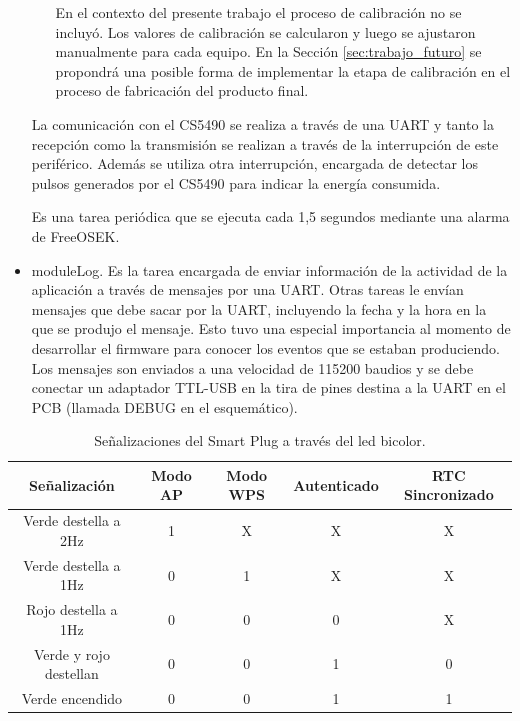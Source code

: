 \begin{itemize}
\begin{itemize}
En el contexto del presente trabajo el proceso de calibración no se incluyó. Los valores de calibración se calcularon y luego se ajustaron manualmente para cada equipo. En la Sección \ref{sec:trabajo_futuro} se propondrá una posible forma de implementar la etapa de calibración en el proceso de fabricación del producto final.
\end{itemize}

La comunicación con el CS5490 se realiza a través de una UART y tanto la recepción como la transmisión se realizan a través de la interrupción de este periférico. Además se utiliza otra interrupción, encargada de detectar los pulsos generados por el CS5490 para indicar la energía consumida.

Es una tarea periódica que se ejecuta cada 1,5 segundos mediante una alarma de FreeOSEK.

\item moduleLog. Es la tarea encargada de enviar información de la actividad de la aplicación a través de mensajes por una UART. Otras tareas le envían mensajes que debe sacar por la UART, incluyendo la fecha y la hora en la que se produjo el mensaje. Esto tuvo una especial importancia al momento de desarrollar el firmware para conocer los eventos que se estaban produciendo. Los mensajes son enviados a una velocidad de 115200 baudios y se debe conectar un adaptador TTL-USB en la tira de pines destina a la UART en el PCB (llamada DEBUG en el esquemático).

\end{itemize}


\begin{table}[h]
	\centering
	\caption[Señalizaciones del Smart Plug]{Señalizaciones del Smart Plug a través del led bicolor.}
	\begin{tabular}{c c c c c}    
		\toprule
		\textbf{Señalización} 	 & \textbf{Modo AP}  & \textbf{Modo WPS}  & \textbf{Autenticado}  & \textbf{RTC Sincronizado} \\
		\midrule
		Verde destella a 2Hz	 	& 1  & X  & X  & X \\		
		Verde destella a 1Hz	 	& 0  & 1  & X  & X \\
		Rojo destella a 1Hz	 		& 0  & 0  & 0  & X \\
		Verde y rojo destellan	 	& 0  & 0  & 1  & 0 \\
		Verde encendido	 			& 0  & 0  & 1  & 1 \\
		\bottomrule
		\hline
	\end{tabular}
	\label{tab:senializacion_leds}
\end{table}



